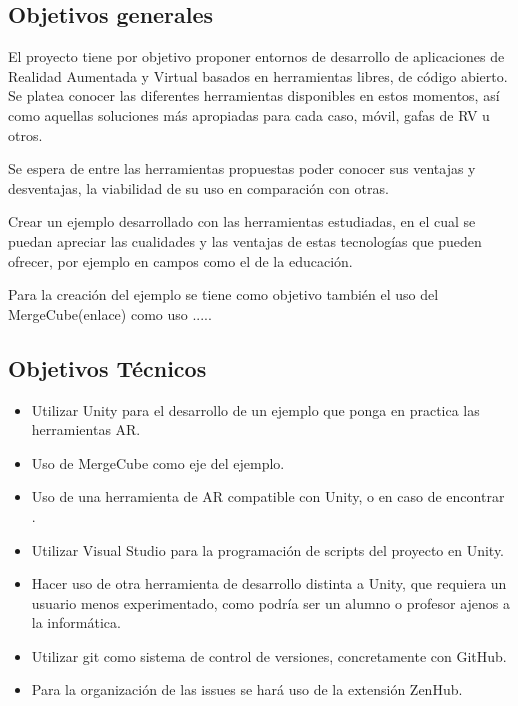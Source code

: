
\subsection{Objetivos generales}
El proyecto tiene por objetivo proponer entornos de desarrollo de aplicaciones de Realidad Aumentada y Virtual basados en herramientas libres, de código abierto. Se platea conocer las diferentes herramientas disponibles en estos momentos, así como aquellas soluciones más apropiadas para cada caso, móvil, gafas de RV u otros.

Se espera de entre las herramientas propuestas poder conocer sus ventajas y desventajas, la viabilidad de su uso en comparación con otras.

Crear un ejemplo desarrollado con las herramientas estudiadas, en el cual se puedan apreciar las cualidades y las ventajas de estas tecnologías que pueden ofrecer, por ejemplo en campos como el de la educación.

Para la creación del ejemplo se tiene como objetivo también el uso del MergeCube(enlace) como uso .....

\subsection{Objetivos Técnicos}
\begin{itemize}
\item Utilizar Unity para el desarrollo de un ejemplo que ponga en practica las herramientas AR.
\item Uso de MergeCube como eje del ejemplo.
\item Uso de una herramienta de AR compatible con Unity, o en caso de encontrar .
\item Utilizar Visual Studio para la programación de scripts del proyecto en Unity.
\item Hacer uso de otra herramienta de desarrollo distinta a Unity, que requiera un usuario menos experimentado, como podría ser un alumno o profesor ajenos a la informática.
\item Utilizar git como sistema de control de versiones, concretamente con GitHub.
\item Para la organización de las issues  se hará uso de la extensión ZenHub.

	
\end{itemize}


